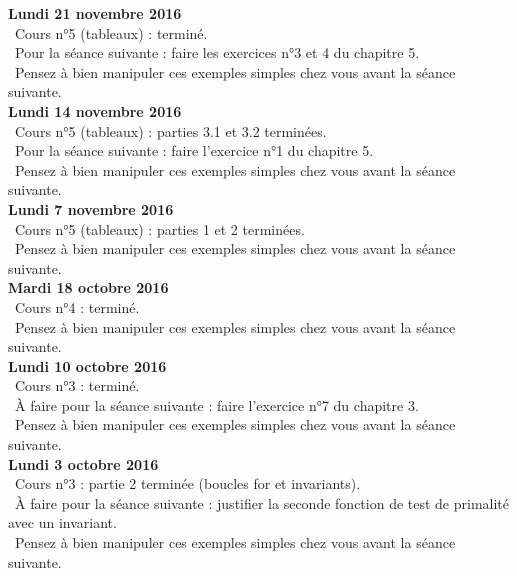 \documentclass[12pt,a4paper]{article}
\begin{document}
\noindent\textbf{Lundi 21 novembre 2016 }\\
\bu\ Cours n°5 (tableaux) : terminé. \\
\bu\ Pour la séance suivante : faire les exercices n°3 et 4 du chapitre 5. \\
\bu\ Pensez à bien manipuler ces exemples simples chez vous avant la séance suivante. \vspace{.4cm}\\

\noindent\textbf{Lundi 14 novembre 2016 }\\
\bu\ Cours n°5 (tableaux) : parties 3.1 et 3.2 terminées. \\
\bu\ Pour la séance suivante : faire l'exercice n°1 du chapitre 5. \\
\bu\ Pensez à bien manipuler ces exemples simples chez vous avant la séance suivante. \vspace{.4cm}\\

\noindent\textbf{Lundi 7 novembre 2016 }\\
\bu\ Cours n°5 (tableaux) : parties 1 et 2 terminées. \\
\bu\ Pensez à bien manipuler ces exemples simples chez vous avant la séance suivante. \vspace{.4cm}\\

\noindent\textbf{Mardi 18 octobre 2016 }\\
\bu\ Cours n°4 : terminé. \\
\bu\ Pensez à bien manipuler ces exemples simples chez vous avant la séance suivante. \vspace{.4cm}\\

\noindent\textbf{Lundi 10 octobre 2016 }\\
\bu\ Cours n°3 : terminé. \\
\bu\ À faire pour la séance suivante : faire l'exercice n°7 du chapitre 3. \\
\bu\ Pensez à bien manipuler ces exemples simples chez vous avant la séance suivante. \vspace{.4cm}\\

\noindent\textbf{Lundi 3 octobre 2016 }\\
\bu\ Cours n°3 : partie 2 terminée (boucles for et invariants). \\
\bu\ À faire pour la séance suivante : justifier la seconde fonction de test de primalité avec un invariant. \\
\bu\ Pensez à bien manipuler ces exemples simples chez vous avant la séance suivante. \vspace{.4cm}\\
\end{document}
